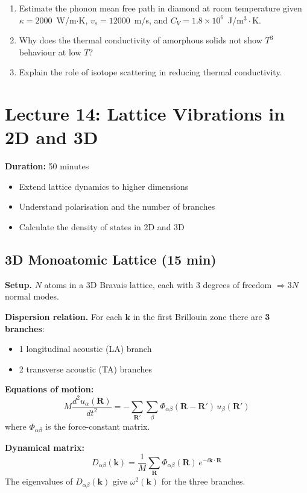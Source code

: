 \documentclass[11pt,a4paper]{article}
\newcommand{\lecheader}[3]{%
  \section{Lecture #1: #2}
  \noindent\textbf{Duration:} #3\par\vspace{4pt}
}
\begin{document}
\begin{probbox}
\begin{enumerate}
\item Estimate the phonon mean free path in diamond at room temperature given
$\kappa=2000$~W/m$\cdot$K, $v_s=12000$~m/s, and $C_V=1.8\times10^6$~J/m$^3\cdot$K.
\item Why does the thermal conductivity of amorphous solids not show $T^3$ behaviour
at low $T$?
\item Explain the role of isotope scattering in reducing thermal conductivity.
\end{enumerate}
\end{probbox}

\newpage
\lecheader{14}{Lattice Vibrations in 2D and 3D}{50 minutes}

\begin{keybox}
\begin{itemize}
\item Extend lattice dynamics to higher dimensions
\item Understand polarisation and the number of branches
\item Calculate the density of states in 2D and 3D
\end{itemize}
\end{keybox}

\subsection{3D Monoatomic Lattice \hfill \small(15 min)}

\textbf{Setup.} $N$ atoms in a 3D Bravais lattice, each with 3 degrees of freedom
$\Rightarrow 3N$ normal modes.

\textbf{Dispersion relation.} For each $\mathbf k$ in the first Brillouin zone there
are \textbf{3 branches}:
\begin{itemize}
\item 1 longitudinal acoustic (LA) branch
\item 2 transverse acoustic (TA) branches
\end{itemize}

\textbf{Equations of motion:}
\[
M\frac{d^2u_\alpha(\mathbf R)}{dt^2} = -\sum_{\mathbf R'}\sum_\beta\Phi_{\alpha\beta}(\mathbf R-\mathbf R')\,u_\beta(\mathbf R')
\]
where $\Phi_{\alpha\beta}$ is the force-constant matrix.

\textbf{Dynamical matrix:}
\[
D_{\alpha\beta}(\mathbf k) = \frac1M\sum_{\mathbf R}\Phi_{\alpha\beta}(\mathbf R)\,e^{-i\mathbf k\cdot\mathbf R}
\]
The eigenvalues of $D_{\alpha\beta}(\mathbf k)$ give $\omega^2(\mathbf k)$ for the
three branches.
\end{document}
